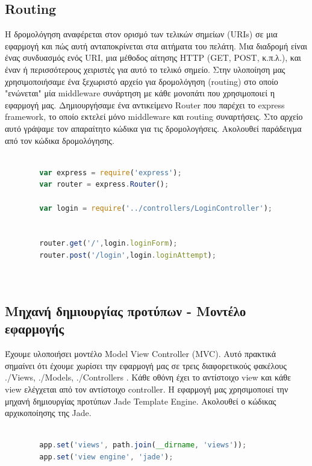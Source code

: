 		\subsection{Routing}
	
		Η δρομολόγηση αναφέρεται στον ορισμό των τελικών σημείων (URIs) σε μια εφαρμογή και πώς αυτή ανταποκρίνεται στα αιτήματα του πελάτη. Μια διαδρομή είναι ένας συνδυασμός ενός URI, μια μέθοδος αίτησης HTTP (GET, POST, κ.π.λ.), και έναν ή περισσότερους χειριστές για αυτό το τελικό σημείο. 
		Στην υλοποίηση μας χρησιμοποιήσαμε ένα ξεχωριστό αρχείο για δρομολόγηση (routing) στο οποίο "ενώνεται" μία middleware συνάρτηση με κάθε μονοπάτι που χρησιμοποιεί η εφαρμογή μας. Δημιουργήσαμε ένα αντικείμενο Router που παρέχει το express framework, το οποίο εκτελεί μόνο middleware και routing συναρτήσεις. Στο αρχείο αυτό γράψαμε τον απαραίτητο κώδικα για τις δρομολογήσεις. Ακολουθεί παράδειγμα από τον κώδικα δρομολόγησης.

		\begin{lstlisting}[language=Javascript]			
		
		var express = require('express');
		var router = express.Router(); 

		var login = require('../controllers/LoginController');


		router.get('/',login.loginForm); 
		router.post('/login',login.loginAttempt);
	
	
	 		\end{lstlisting}
	 		
	\subsection*{Μηχανή δημιουργίας προτύπων - Μοντέλο εφαρμογής }

		Έχουμε υλοποιήσει μοντέλο Model View Controller (MVC). Αυτό πρακτικά σημαίνει ότι έχουμε χωρίσει την εφαρμογή μας σε τρεις διαφορετικούς φακέλους  ./Views, ./Models, ./Controllers . Κάθε οθόνη έχει το αντίστοιχο view και κάθε view ελέγχεται από τον αντίστοιχο controller.  
		Η εφαρμογή μας χρησιμοποιεί την μηχανή δημιουργίας προτύπων Jade Template Engine. Ακολουθεί ο κώδικας αρχικοποίησης της Jade.
		
		\begin{lstlisting}[language=Javascript]			
		
		app.set('views', path.join(__dirname, 'views'));
		app.set('view engine', 'jade');
	
		\end{lstlisting}
		
